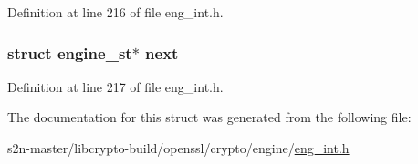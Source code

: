 Definition at line 216 of file eng\+\_\+int.\+h.

\subsubsection[{\texorpdfstring{next}{next}}]{\setlength{\rightskip}{0pt plus 5cm}struct {\bf engine\+\_\+st}$\ast$ next}\hypertarget{structengine__st_abff10beeedd45eeb4a3905a6ad16ec41}{}\label{structengine__st_abff10beeedd45eeb4a3905a6ad16ec41}


Definition at line 217 of file eng\+\_\+int.\+h.



The documentation for this struct was generated from the following file\+:\begin{DoxyCompactItemize}
\item 
s2n-\/master/libcrypto-\/build/openssl/crypto/engine/\hyperlink{eng__int_8h}{eng\+\_\+int.\+h}\end{DoxyCompactItemize}
